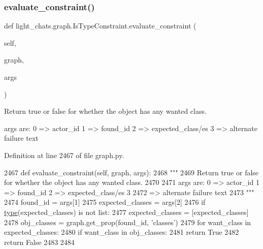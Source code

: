 \subsubsection{\texorpdfstring{evaluate\+\_\+constraint()}{evaluate\_constraint()}}
{\footnotesize\ttfamily def light\+\_\+chats.\+graph.\+Is\+Type\+Constraint.\+evaluate\+\_\+constraint (\begin{DoxyParamCaption}\item[{}]{self,  }\item[{}]{graph,  }\item[{}]{args }\end{DoxyParamCaption})}

\begin{DoxyVerb}Return true or false for whether the object has any wanted class.

args are:     0 => actor_id     1 => found_id     2 => expected_class/es     3
=> alternate failure text
\end{DoxyVerb}
 

Definition at line 2467 of file graph.\+py.


\begin{DoxyCode}
2467     \textcolor{keyword}{def }evaluate\_constraint(self, graph, args):
2468         \textcolor{stringliteral}{"""}
2469 \textcolor{stringliteral}{        Return true or false for whether the object has any wanted class.}
2470 \textcolor{stringliteral}{}
2471 \textcolor{stringliteral}{        args are:     0 => actor\_id     1 => found\_id     2 => expected\_class/es     3}
2472 \textcolor{stringliteral}{        => alternate failure text}
2473 \textcolor{stringliteral}{        """}
2474         found\_id = args[1]
2475         expected\_classes = args[2]
2476         \textcolor{keywordflow}{if} \hyperlink{namespaceparlai_1_1agents_1_1tfidf__retriever_1_1build__tfidf_ad5dfae268e23f506da084a9efb72f619}{type}(expected\_classes) \textcolor{keywordflow}{is} \textcolor{keywordflow}{not} list:
2477             expected\_classes = [expected\_classes]
2478         obj\_classes = graph.get\_prop(found\_id, \textcolor{stringliteral}{'classes'})
2479         \textcolor{keywordflow}{for} want\_class \textcolor{keywordflow}{in} expected\_classes:
2480             \textcolor{keywordflow}{if} want\_class \textcolor{keywordflow}{in} obj\_classes:
2481                 \textcolor{keywordflow}{return} \textcolor{keyword}{True}
2482         \textcolor{keywordflow}{return} \textcolor{keyword}{False}
2483 
2484 
\end{DoxyCode}
\mbox{\label{classlight__chats_1_1graph_1_1IsTypeConstraint_a1443cca8a343b530929093446b1b914f}} 
